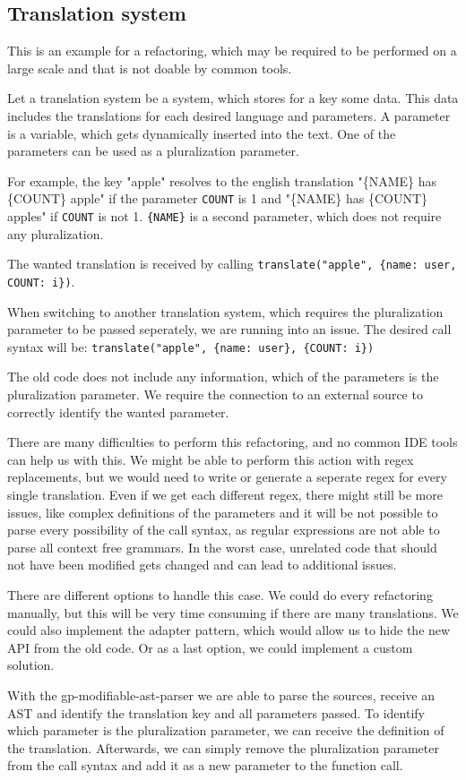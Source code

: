 
\subsection{Translation system}

This is an example for a refactoring, which may be required to be performed on a large scale and that is not doable by common tools.

Let a translation system be a system, which stores for a key some data. This data includes the translations for each desired language and parameters.
A parameter is a variable, which gets dynamically inserted into the text. One of the parameters can be used as a pluralization parameter.

For example, the key "apple" resolves to the english translation "\{NAME\} has \{COUNT\} apple" if the parameter \lstinline|COUNT| is 1 and "\{NAME\} has \{COUNT\} apples" if \lstinline|COUNT| is not 1.
\lstinline|{NAME}| is a second parameter, which does not require any pluralization.

The wanted translation is received by calling \lstinline|translate("apple", {name: user, COUNT: i})|.


When switching to another translation system, which requires the pluralization parameter to be passed seperately, we are running into an issue. 
The desired call syntax will be: \lstinline|translate("apple", {name: user}, {COUNT: i})|

The old code does not include any information, which of the parameters is the pluralization parameter. 
We require the connection to an external source to correctly identify the wanted parameter.

There are many difficulties to perform this refactoring, and no common IDE tools can help us with this.
We might be able to perform this action with regex replacements, but we would need to write or generate a seperate regex for every single translation.
Even if we get each different regex, there might still be more issues, like complex definitions of the parameters and it will be not possible to 
parse every possibility of the call syntax, as regular expressions are not able to parse all context free grammars.
In the worst case, unrelated code that should not have been modified gets changed and can lead to additional issues.

There are different options to handle this case. We could do every refactoring manually, but this will be very time consuming if there are many translations.
We could also implement the adapter pattern, which would allow us to hide the new API from the old code. Or as a last option, we could implement a custom solution.

With the gp-modifiable-ast-parser we are able to parse the sources, receive an AST and identify the translation key and all parameters passed.
To identify which parameter is the pluralization parameter, we can receive the definition of the translation. Afterwards, we can simply remove the pluralization parameter
from the call syntax and add it as a new parameter to the function call.
